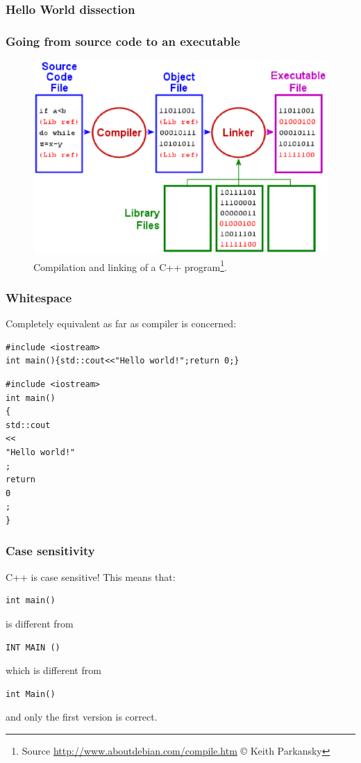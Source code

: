 \documentclass{beamer}
\begin{document}
\begin{frame}[fragile]
  \frametitle{Hello World dissection}
  \begin{semiverbatim}
  \end{semiverbatim}
\end{frame}

\begin{frame}
  \frametitle{Going from source code to an executable}
  
  \begin{figure}%
    \includegraphics[width=0.6\columnwidth]{figs/compile.eps}%
    \caption{Compilation and linking of a C++ program\footnote{Source \url{http://www.aboutdebian.com/compile.htm} \copyright{} Keith Parkansky}.}%
  \end{figure}

\end{frame}

\begin{frame}[fragile]
  \frametitle{Whitespace}
  \pause
  
  Completely equivalent as far as compiler is concerned:
  \begin{lstlisting}
#include <iostream>
int main(){std::cout<<"Hello world!";return 0;}
  \end{lstlisting}
  \begin{lstlisting}
#include <iostream>
int main()
{
std::cout
<<
"Hello world!"
;
return
0
;
}  \end{lstlisting}
\end{frame}

\begin{frame}[fragile]
  \frametitle{Case sensitivity}
  C++ is case sensitive!  This means that:
  \begin{lstlisting}
int main()
  \end{lstlisting}
  is different from
  \begin{lstlisting}
INT MAIN ()
  \end{lstlisting}
  which is different from
  \begin{lstlisting}
int Main()
  \end{lstlisting}
  and only the first version is correct.
\end{frame}
\end{document}

